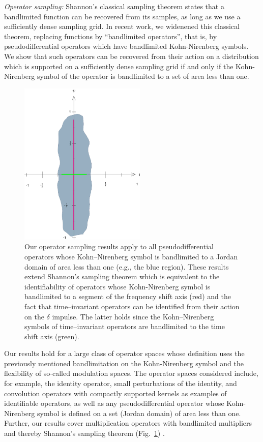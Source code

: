 {\sl Operator sampling:}
Shannon's classical sampling theorem states that a bandlimited
function can be recovered from its samples, as long as we use a
sufficiently dense sampling grid. In recent work, we widenened this
classical theorem, replacing functions by ``bandlimited operators'',
that is, by pseudodifferential operators which have bandlimited
Kohn-Nirenberg symbols. We show that such operators can be recovered
from their action on a distribution which is supported on a
sufficiently dense sampling grid if and only if the Kohn-Nirenberg
symbol of the operator is bandlimited to a set of area less than
one.


\begin{figure}[ht]
  \begin{center}
   \includegraphics[width=6cm]{Pfander/pfander2.png}
    \caption{\small Our operator sampling results apply to
    all pseudodifferential operators whose Kohn--Nirenberg symbol
    is bandlimited to a Jordan domain of area less than one (e.g., the blue
    region). These results extend
    Shannon's sampling theorem which is equivalent to the identifiability of
    operators whose Kohn-Nirenberg symbol is bandlimited to a segment of the frequency shift axis (red) and
    the fact that time--invariant operators can be identified from their action on the $\delta$
    impulse. The latter holds since the Kohn--Nirenberg symbols of time--invariant operators
    are bandlimited to the time shift axis
    (green).
                }
    \label{fig:pfander2-pic-1}
  \end{center}
\end{figure}

Our results hold for a large class of operator spaces whose
definition uses the previously mentioned bandlimitation on the
Kohn-Nirenberg symbol and the flexibility of so-called modulation
spaces.  The operator spaces considered include, for example, the
identity operator, small perturbations of the identity, and
convolution operators with compactly supported kernels as examples
of identifiable operators, as well as any pseudodifferential
operator whose Kohn-Nirenberg symbol is defined on a set (Jordan
domain) of area less than one. Further, our results cover
multiplication operators with bandlimited multipliers and thereby
Shannon's sampling theorem (Fig.~\ref{fig:pfander2-pic-1}) .


